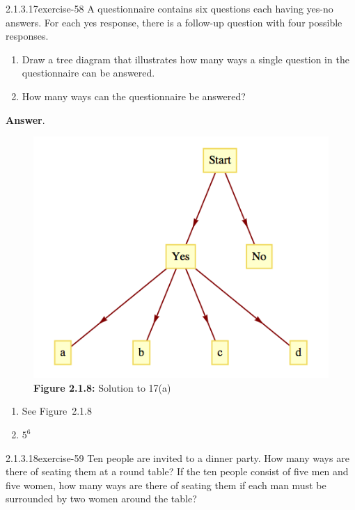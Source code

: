 \documentclass[twoside,10pt,]{book}
\numberwithin{equation}{section}
\begin{document}
\begin{divisionsolution}{2.1.3.17}{}{exercise-58}%
\hypertarget{p-618}{}%
A questionnaire contains six questions each having yes-no answers. For each yes response, there is a follow-up question with four possible responses.%
\par
\hypertarget{p-619}{}%
\leavevmode%
\begin{enumerate}[label=(\alph*)]
\item\hypertarget{li-408}{}\hypertarget{p-620}{}%
Draw a tree diagram that illustrates how many ways a single question in the questionnaire can be answered.%
\item\hypertarget{li-409}{}\hypertarget{p-621}{}%
How many ways can the questionnaire be answered?%
\end{enumerate}
%
\par\smallskip%
\noindent\textbf{Answer}.\quad%
\leavevmode%
\begin{figure}
\centering
\includegraphics[width=1\linewidth]{images/fig-sol-2-1-17.png}
\caption*{\textbf{Figure 2.1.8:} Solution to 17(a)}
\end{figure}
\hypertarget{p-622}{}%
\leavevmode%
\begin{enumerate}[label=(\alph*)]
\item\hypertarget{li-410}{}\hypertarget{p-623}{}%
See Figure~2.1.8%
\item\hypertarget{li-411}{}\hypertarget{p-624}{}%
\(5^6\)%
\end{enumerate}
%
\end{divisionsolution}%
\begin{divisionsolution}{2.1.3.18}{}{exercise-59}%
\hypertarget{p-625}{}%
Ten people are invited to a dinner party. How many ways are there of seating them at a round table? If the ten people consist of five men and five women, how many ways are there of seating them if each man must be surrounded by two women around the table?%
\end{divisionsolution}%
\end{document}
